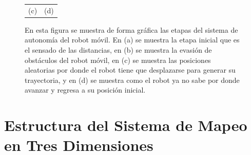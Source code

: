 \begin{figure}
\begin{tabular}{cc}
        (c)&(d)
    \end{tabular}
  \captionsetup{font=footnotesize}
    \caption{\label{f:SistemaAutonomo} En esta figura se muestra de forma gráfica las etapas del 
    sistema de autonomía del robot móvil. En (a) se muestra la etapa inicial que es el sensado de 
    las distancias, en (b) se muestra la evasión de obstáculos del robot móvil, en (c) se muestra
    las posiciones aleatorias por donde el robot tiene que desplazarse para generar su 
    trayectoria, y en (d) se muestra como el robot ya no sabe por donde avanzar y regresa a su 
    posición inicial.}
\end{figure}




\section{Estructura del Sistema de Mapeo en Tres Dimensiones}
\label{sec:Sistema3D}

